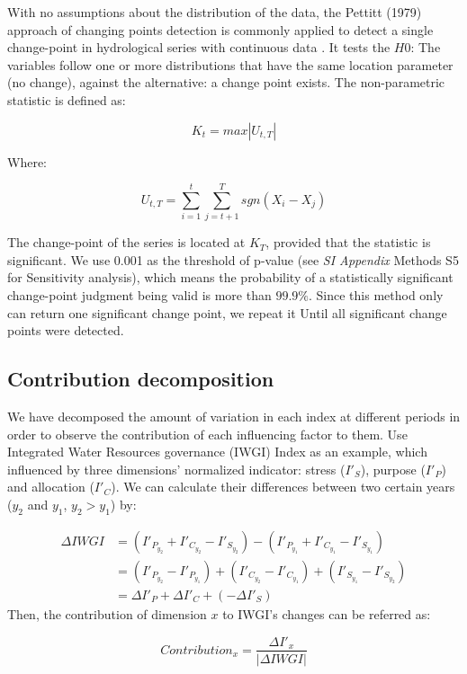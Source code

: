\documentclass[9pt, twocolumn, twoside, lineno]{pnas-new}
\begin{document}
{		With no assumptions about the distribution of the data, the Pettitt (1979) approach of changing points detection is commonly applied to detect a single change-point in hydrological series with continuous data \cite{pettittNonParametricApproachChangePoint1979}. 
		It tests the $H0$: The variables follow one or more distributions that have the same location parameter (no change), against the alternative: a change point exists. The non-parametric statistic is defined as:
	
		$$ K_t = max|U_{t, T}|$$

		Where:

		$$ U_{t, T} = \sum_{i=1}^t\sum_{j=t+1}^T sgn(X_i - X_j) $$
	
		The change-point of the series is located at $K_T$, provided that the statistic is significant. We use 0.001 as the threshold  of p-value (see \textit{SI Appendix} Methods S5 for Sensitivity analysis), which means the probability of a statistically significant change-point judgment being valid is more than $99.9\%$.
		Since this method only can return one significant change point, we repeat it Until all significant change points were detected.
	
	\subsection*{Contribution decomposition}
		We have decomposed the amount of variation in each index at different periods in order to observe the contribution of each influencing factor to them. Use Integrated Water Resources governance (IWGI) Index as an example, which influenced by three dimensions' normalized indicator: stress ($I'_S$), purpose ($I'_P$) and allocation ($I'_C$). We can calculate their differences between two certain years ($y_2$ and $y_1$, $y_2 > y_1$) by:

		\begin{align*}
			\Delta IWGI &= (I'_{P_{y_2}} + I'_{C_{y_2}} - I'_{S_{y_2}}) - (I'_{P_{y_1}} + I'_{C_{y_1}} - I'_{S_{y_1}}) \\
			&= (I'_{P_{y_2}} - I'_{P_{y_1}}) + (I'_{C_{y_2}} - I'_{C_{y_1}}) + (I'_{S_{y_1}} - I'_{S_{y_2}}) \\
			&= \Delta I'_P + \Delta I'_C + (-\Delta I'_S)
		\end{align*}
		Then, the contribution of dimension $x$ to IWGI's changes can be referred as:

		$$ Contribution_x = \frac{\Delta I'_x}{|\Delta IWGI|} $$

}
\end{document}
